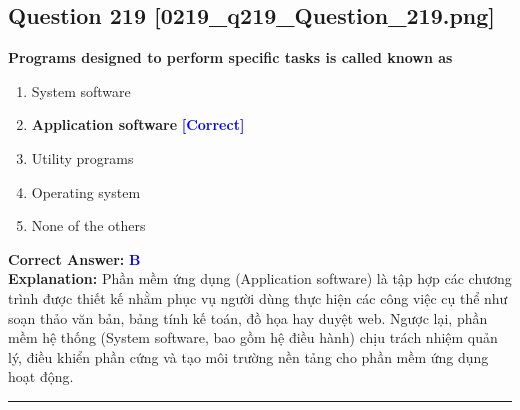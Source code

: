\documentclass[11pt,a4paper]{article}
\begin{document}
\begin{minipage}{\textwidth}
\subsection*{Question 219 \quad \footnotesize{[0219\_q219\_Question\_219.png]}}
\noindent \textbf{Programs designed to perform specific tasks is called known as}

\begin{enumerate}[label=\Alph*.]
    \item System software
    \item \textbf{Application software} \hfill \textcolor{blue}{\textbf{[Correct]}}
    \item Utility programs
    \item Operating system
    \item None of the others
\end{enumerate}

\noindent \textbf{Correct Answer:} \textcolor{blue}{\textbf{B}} \\[2pt]
\noindent \textbf{Explanation:} Phần mềm ứng dụng (Application software) là tập hợp các chương trình được thiết kế nhằm phục vụ người dùng thực hiện các công việc cụ thể như soạn thảo văn bản, bảng tính kế toán, đồ họa hay duyệt web. Ngược lại, phần mềm hệ thống (System software, bao gồm hệ điều hành) chịu trách nhiệm quản lý, điều khiển phần cứng và tạo môi trường nền tảng cho phần mềm ứng dụng hoạt động.

\par\vspace{0.3cm}
\hrule
\vspace{0.3cm}
\end{minipage}
\end{document}
